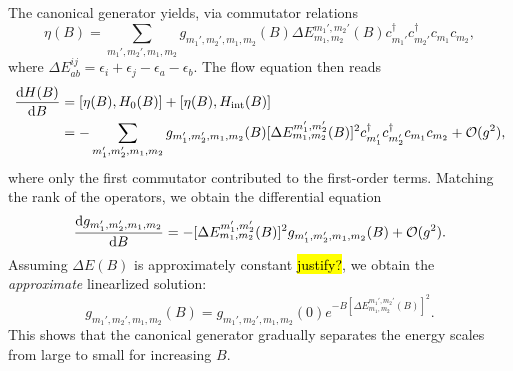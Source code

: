 \documentclass{article}
\begin{document}
The canonical generator yields, via commutator relations
\begin{equation}
\eta(B)=\sum_{m_1',m_2',m_1,m_2} g_{m_1',m_2',m_1,m_2}(B) \Delta E^{m_1',m_2'}_{m_1,m_2}(B) c_{m_1'}^{\dagger}c_{m_2'}^{\dagger}c_{m_1}c_{m_2},
\end{equation}
where $\Delta E^{ij}_{ab}=\epsilon_i+\epsilon_j-\epsilon_a-\epsilon_b$. The flow equation then reads
\begin{align}
\diff{H(B)}{B}&=[\eta(B),H_0(B)]+[\eta(B),H_{\mathrm{int}}(B)]\\
&=-\sum_{m_1',m_2',m_1,m_2} g_{m_1',m_2',m_1,m_2}(B) [\Delta E^{m_1',m_2'}_{m_1,m_2}(B)]^2 c_{m_1'}^{\dagger}c_{m_2'}^{\dagger}c_{m_1}c_{m_2}+\mathcal{O}(g^2),
\end{align}
where only the first commutator contributed to the first-order terms. Matching the rank of the operators, we obtain the differential equation
\begin{equation}
\diff{g_{m_1',m_2',m_1,m_2}}{B}=-[\Delta E^{m_1',m_2'}_{m_1,m_2}(B)]^2 g_{m_1',m_2',m_1,m_2}(B)+\mathcal{O}(g^2).
\end{equation}
Assuming $\Delta E(B)$ is approximately constant \hl{justify?}, we obtain the \textit{approximate} linearlized solution:
\begin{equation}
g_{m_1',m_2',m_1,m_2}(B)=g_{m_1',m_2',m_1,m_2}(0)e^{-B[\Delta E^{m_1',m_2'}_{m_1,m_2}(B)]^2}.
\end{equation}
This shows that the canonical generator gradually separates the energy scales from large to small for increasing $B$.
\end{document}
